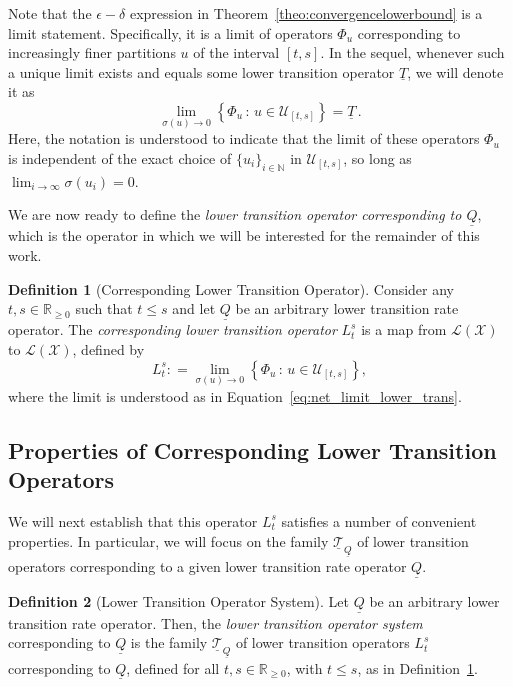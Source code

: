\documentclass[10pt,a4paper]{paper}
\theoremstyle{definition}
\newtheorem{definition}{Definition}
\newcommand{\nats}{\mathbb{N}}
\newcommand{\reals}{\mathbb{R}}
\newcommand{\realsnonneg}{\reals_{\geq 0}}
\newcommand{\states}{\mathcal{X}}
\newcommand{\lt}{\underline{T}}
\newcommand{\lbound}{L}
\newcommand{\gambles}{\mathcal{L}}
\newcommand{\gamblesX}{\gambles(\states)}
\newcommand{\lrate}{\underline{Q}}
\newcommand{\coloneqq}{:\!=}
\begin{document}
Note that the $\epsilon-\delta$ expression in Theorem~\ref{theo:convergencelowerbound} is a limit statement. Specifically, it is a limit of operators $\Phi_{u}$ corresponding to increasingly finer partitions $u$ of the interval $[t,s]$. In the sequel, whenever such a unique limit exists and equals some lower transition operator $\lt$, we will denote it as
\begin{equation}\label{eq:net_limit_lower_trans}
\lim_{\sigma(u)\to0}\left\{\Phi_u\,\colon\,u\in\mathcal{U}_{[t,s]}\right\} = \lt\,.
\end{equation}
Here, the notation is understood to indicate that the limit of these operators $\Phi_{u}$ is independent of the exact choice of $\{u_i\}_{i\in\nats}$ in $\mathcal{U}_{[t,s]}$, so long as $\lim_{i\to\infty}\sigma(u_i)=0$.

We are now ready to define the \emph{lower transition operator corresponding to $\lrate$}, which is the operator in which we will be interested for the remainder of this work.

\begin{definition}[Corresponding Lower Transition Operator]\label{def:low_trans}
Consider any $t,s\in\realsnonneg$ such that $t\leq s$ and let $\lrate$ be an arbitrary lower transition rate operator. The \emph{corresponding lower transition operator} $\lbound_t^s$ is a map from $\gamblesX$ to $\gamblesX$, defined by
\begin{equation*}%
\lbound_t^s\coloneqq\lim_{\sigma(u)\to0}\left\{ \Phi_u\,\colon\,u\in\mathcal{U}_{[t,s]}\right\},
\end{equation*}
where the limit is understood as in Equation~\eqref{eq:net_limit_lower_trans}.
\end{definition}

\subsection{Properties of Corresponding Lower Transition Operators}\label{sec:properties_lower_trans}

We will next establish that this operator $L_t^s$ satisfies a number of convenient properties. In particular, we will focus on the family $\underline{\mathcal{T}}_{\lrate}$ of lower transition operators corresponding to a given lower transition rate operator $\lrate$.

\begin{definition}[Lower Transition Operator System]\label{def:low_trans_system}
Let $\lrate$ be an arbitrary lower transition rate operator. Then, the \emph{lower transition operator system} corresponding to $\lrate$ is the family $\underline{\mathcal{T}}_{\lrate}$ of lower transition operators $L_t^s$ corresponding to $\lrate$, defined for all $t,s\in\realsnonneg$, with $t\leq s$, as in Definition~\ref{def:low_trans}.
\end{definition}
\end{document}
